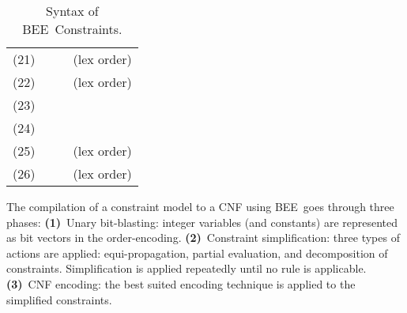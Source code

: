 \documentclass[runningheads,a4paper]{llncs}
\newcommand{\bee}{\textsf{BEE}}
\begin{document}
\begin{table}[t]
\begin{tabular}{rlll}
(21)&      &&
              (lex order)\\
(22)&      &&
              (lex order)\\
(23)&      &&
             \\
(24)&      &&
             \\

(25)&      &&
              (lex order)\\
(26)&      &&
              (lex order)\\



\hline\hline
\end{tabular}
  \caption{Syntax of \bee\ Constraints. }
  \label{tab:beeSyntax}
\end{table}



The compilation of a constraint model to a CNF
using \bee\ goes through three phases:
\textbf{(1)}~Unary bit-blasting: integer variables (and constants) are
  represented as bit vectors in the order-encoding.
\textbf{(2)}~Constraint simplification: three types of actions are applied:
  equi-propagation, partial evaluation, and decomposition of
  constraints.  Simplification is applied repeatedly until no rule is
  applicable.
\textbf{(3)}~CNF encoding: the best suited encoding technique is applied to
  the simplified constraints.
\end{document}
